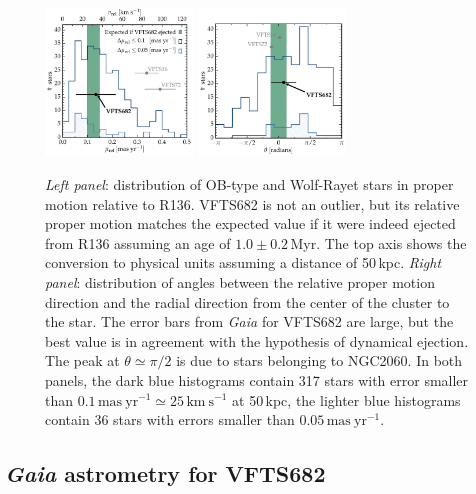\documentclass[apjl,twocolumn]{emulateapj}
\begin{document}
\vspace*{10pt}%
\begin{figure}[tbp]
  \centering
  \includegraphics[width=0.35\textwidth]{figures/dist_mu_region.pdf}
  \includegraphics[width=0.35\textwidth]{figures/angle}
  \caption{\emph{Left panel}: distribution of OB-type and Wolf-Rayet stars in proper
    motion relative to R136. VFTS682 is not an outlier, but
    its relative proper motion matches the expected value if it were indeed
    ejected from R136 assuming an age of $1.0\pm0.2$\,Myr. The top axis shows the conversion to physical units
    assuming a distance of 50\,kpc. \emph{Right panel}:  distribution of
    angles between the relative proper motion direction and the radial
    direction from the center of the cluster to the star. The error bars from \emph{Gaia} for VFTS682 are large, but
    the best value is in agreement with the hypothesis of dynamical
    ejection. The peak at $\theta\simeq\pi/2$ is due to stars
    belonging to NGC2060. In both
    panels, the dark blue histograms contain 317 
    stars with error smaller than $0.1\,\mathrm{mas \
      yr^{-1}}\simeq25\,\mathrm{km\ s^{-1}}$ at 50\,kpc, the
    lighter blue histograms contain 36 stars with errors smaller than $0.05\,\mathrm{mas \
      yr^{-1}}$. }
  \label{fig:dist}
\end{figure}

\subsection{ \emph{Gaia} astrometry for VFTS682\label{data:gaia}}
\end{document}
